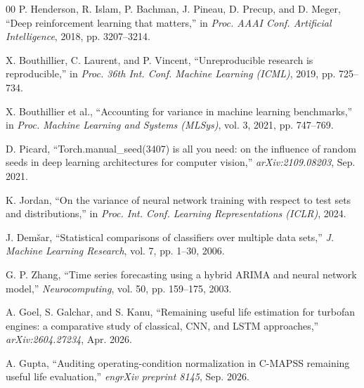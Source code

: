 \documentclass[conference]{IEEEtran}
\begin{document}
\begin{thebibliography}{00}
 P. Henderson, R. Islam, P. Bachman, J. Pineau, D. Precup, and D. Meger, ``Deep reinforcement learning that matters,'' in \emph{Proc. AAAI Conf. Artificial Intelligence}, 2018, pp. 3207--3214.

 X. Bouthillier, C. Laurent, and P. Vincent, ``Unreproducible research is reproducible,'' in \emph{Proc. 36th Int. Conf. Machine Learning (ICML)}, 2019, pp. 725--734.

 X. Bouthillier et al., ``Accounting for variance in machine learning benchmarks,'' in \emph{Proc. Machine Learning and Systems (MLSys)}, vol. 3, 2021, pp. 747--769.

 D. Picard, ``Torch.manual\_seed(3407) is all you need: on the influence of random seeds in deep learning architectures for computer vision,'' \emph{arXiv:2109.08203}, Sep. 2021.

 K. Jordan, ``On the variance of neural network training with respect to test sets and distributions,'' in \emph{Proc. Int. Conf. Learning Representations (ICLR)}, 2024.

 J. Dem\v{s}ar, ``Statistical comparisons of classifiers over multiple data sets,'' \emph{J. Machine Learning Research}, vol. 7, pp. 1--30, 2006.

 G. P. Zhang, ``Time series forecasting using a hybrid ARIMA and neural network model,'' \emph{Neurocomputing}, vol. 50, pp. 159--175, 2003.

 A. Goel, S. Galchar, and S. Kanu, ``Remaining useful life estimation for turbofan engines: a comparative study of classical, CNN, and LSTM approaches,'' \emph{arXiv:2604.27234}, Apr. 2026.

 A. Gupta, ``Auditing operating-condition normalization in C-MAPSS remaining useful life evaluation,'' \emph{engrXiv preprint 8145}, Sep. 2026.

\end{thebibliography}
\end{document}
